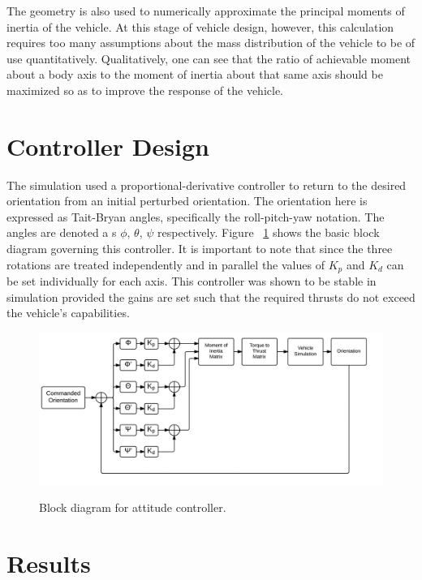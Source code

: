 \documentclass[]{aiaa-tc}%
\begin{document}
The geometry is also used to numerically approximate the principal moments of inertia of the vehicle. At this stage of vehicle design, however, this calculation requires too many assumptions about the mass distribution of the vehicle to be of use quantitatively. Qualitatively, one can see that the ratio of achievable moment about a body axis to the moment of inertia about that same axis should be maximized so as to improve the response of the vehicle.

\section{Controller Design}

The simulation used a proportional-derivative controller to return to the desired orientation from an initial perturbed orientation. The orientation here is expressed as Tait-Bryan angles, specifically the roll-pitch-yaw notation. The angles are denoted a s $\phi$, $\theta$, $\psi$ respectively. Figure ~\ref{fig:control} shows the basic block diagram governing this controller. It is important to note that since the three rotations are treated independently and in parallel the values of $K_{p} $ and $K_{d}$ can be set individually for each axis. This controller was shown to be stable in simulation provided the gains are set such that the required thrusts do not exceed the vehicle’s capabilities.
\begin{figure}[H]
\caption{Block diagram for attitude controller.}
\center
\includegraphics[width=1\textwidth]{Control}
\label{fig:control}
\end{figure}


\section{Results}
\end{document}
